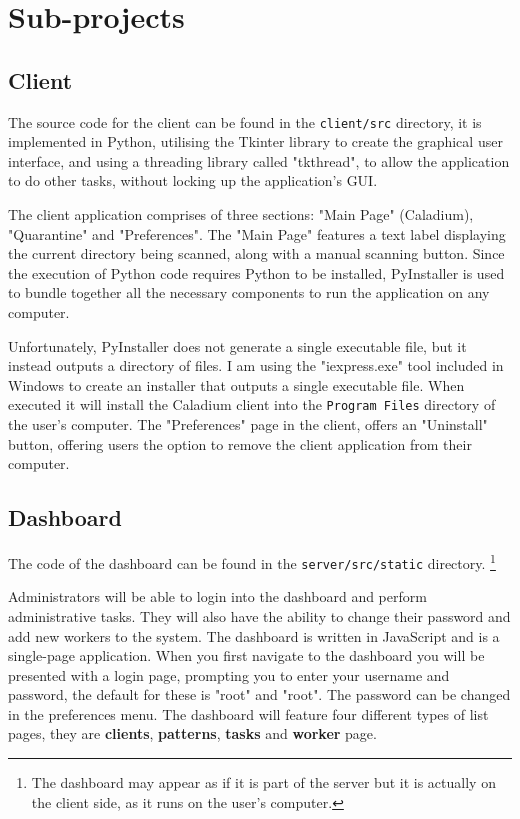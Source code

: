 \section{Sub-projects}
\subsection{Client}
The source code for the client can be found in
the \texttt{client/src} directory, it is implemented in Python,
utilising the Tkinter library to create the graphical user interface,
and using a threading library called "tkthread",
to allow the application to do other tasks,
without locking up the application's GUI.

The client application comprises of three sections:
"Main Page" (Caladium), "Quarantine" and "Preferences".
The "Main Page" features a text label displaying
the current directory being scanned,
along with a manual scanning button.
Since the execution of Python code requires Python to be installed,
PyInstaller is used to bundle together all the
necessary components to run the application on any computer.

Unfortunately, PyInstaller does not generate a single executable file,
but it instead outputs a directory of files.
I am using the "iexpress.exe" tool included in Windows to
create an installer that outputs a single executable file.
When executed it will install the Caladium client
into the \texttt{Program Files} directory of the user's computer.
The "Preferences" page in the client, offers an "Uninstall" button,
offering users the option to remove the client application from their computer.

\subsection{Dashboard}
The code of the dashboard can be found in the \texttt{server/src/static} directory.
\footnote{The dashboard may appear as if it is part of the server
but it is actually on the client side, as it runs on the user's computer.}

Administrators will be able to login into the dashboard
and perform administrative tasks.
They will also have the ability to change their
password and add new workers to the system.
The dashboard is written in JavaScript and is a single-page application.
When you first navigate to the dashboard you will be presented with a login page,
prompting you to enter your username and password,
the default for these is "root" and "root".
The password can be changed in the preferences menu.
The dashboard will feature four different types of list pages,
they are \textbf{clients}, \textbf{patterns},
\textbf{tasks} and \textbf{worker} page.

